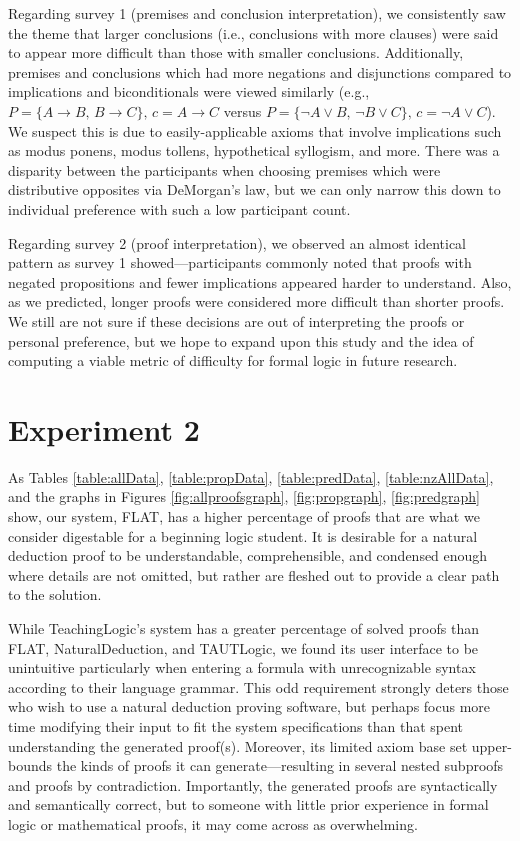 \documentclass[ms]{uncgdissertationexp2}
\theoremstyle{plain}
\theoremstyle{definition}
\theoremstyle{remark}
\begin{document}
Regarding survey 1 (premises and conclusion interpretation), we consistently saw the theme that larger conclusions (i.e., conclusions with more clauses) were said to appear more difficult than those with smaller conclusions. Additionally, premises and conclusions which had more negations and disjunctions compared to implications and biconditionals were viewed similarly (e.g., $P = \{A\to B,\,B \to C\},\,c=A\to C$ versus $P=\{\lnot{A}\lor{B},\,\lnot{B}\lor{C}\},\,c=\lnot{A}\lor{C}$). We suspect this is due to easily-applicable axioms that involve implications such as modus ponens, modus tollens, hypothetical syllogism, and more. There was a disparity between the participants when choosing premises which were distributive opposites via DeMorgan's law, but we can only narrow this down to individual preference with such a low participant count.

Regarding survey 2 (proof interpretation), we observed an almost identical pattern as survey 1 showed---participants commonly noted that proofs with negated propositions and fewer implications appeared harder to understand. Also, as we predicted, longer proofs were considered more difficult than shorter proofs. We still are not sure if these decisions are out of interpreting the proofs or personal preference, but we hope to expand upon this study and the idea of computing a viable metric of difficulty for formal logic in future research.

\section{Experiment 2}
As Tables \ref{table:allData}, \ref{table:propData}, \ref{table:predData}, \ref{table:nzAllData}, and the graphs in Figures \ref{fig:allproofsgraph}, \ref{fig:propgraph}, \ref{fig:predgraph} show, our system, FLAT, has a higher percentage of proofs that are what we consider digestable for a beginning logic student. It is desirable for a natural deduction proof to be understandable, comprehensible, and condensed enough where details are not omitted, but rather are fleshed out to provide a clear path to the solution. 

While TeachingLogic's system has a greater percentage of solved proofs than FLAT, NaturalDeduction, and TAUTLogic, we found its user interface to be unintuitive particularly when entering a formula with unrecognizable syntax according to their language grammar. This odd requirement strongly deters those who wish to use a natural deduction proving software, but perhaps focus more time modifying their input to fit the system specifications than that spent understanding the generated proof(s). Moreover, its limited axiom base set upper-bounds the kinds of proofs it can generate---resulting in several nested subproofs and proofs by contradiction. Importantly, the generated proofs are syntactically and semantically correct, but to someone with little prior experience in formal logic or mathematical proofs, it may come across as overwhelming. 
\end{document}
